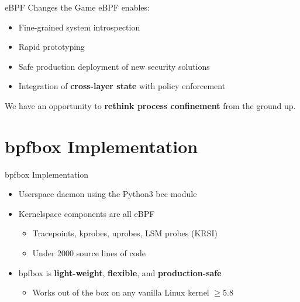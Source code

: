 \documentclass[12pt, dvipsnames]{beamer}
\begin{document}

\begin{frame}[c]{eBPF Changes the Game}
eBPF enables:
\begin{itemize}
    \item Fine-grained system introspection
    \item Rapid prototyping
    \item Safe production deployment of new security solutions
    \item Integration of \textbf{cross-layer state} with policy enforcement
\end{itemize}
\vfill
We have an opportunity to \textbf{rethink process confinement} from the ground up.
\end{frame}

\section{bpfbox Implementation}

\begin{frame}[c]{bpfbox Implementation}
\begin{itemize}
    \item Userspace daemon using the Python3 bcc module
    \vfill
    \item Kernelspace components are all eBPF
    \begin{itemize}
        \item Tracepoints, kprobes, uprobes, LSM probes (KRSI)
        \item Under 2000 source lines of code
    \end{itemize}
    \vfill
    \item bpfbox is \textbf{light-weight}, \textbf{flexible}, and \textbf{production-safe}
    \begin{itemize}
        \item Works out of the box on any vanilla Linux kernel $\ge 5.8$
    \end{itemize}
\end{itemize}
\end{frame}
\end{document}
